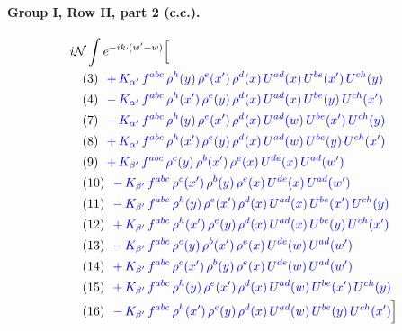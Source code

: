 \documentclass[10pt]{article}
\numberwithin{equation}{section}
\newcommand{\NN}{\mathcal N}
\begin{document}
\paragraph{Group I, Row II, part 2 (c.c.).}
\begin{align*}
&i\NN\int e^{-ik\cdot(w'-w)}\Big[\\
&\quad\text{(3)}\ \ \textcolor{blue}{+\,K_{\alpha'}\,f^{abc}\,\rho^{h}(y)\,\rho^{e}(x')\,\rho^{d}(x)\,U^{ad}(x)\,U^{be}(x')\,U^{ch}(y)}\\
&\quad\text{(4)}\ \ \textcolor{blue}{-\,K_{\alpha'}\,f^{abc}\,\rho^{h}(x')\,\rho^{e}(y)\,\rho^{d}(x)\,U^{ad}(x)\,U^{be}(y)\,U^{ch}(x')}\\
&\quad\text{(7)}\ \ \textcolor{blue}{-\,K_{\alpha'}\,f^{abc}\,\rho^{h}(y)\,\rho^{e}(x')\,\rho^{d}(x)\,U^{ad}(w)\,U^{be}(x')\,U^{ch}(y)}\\
&\quad\text{(8)}\ \ \textcolor{blue}{+\,K_{\alpha'}\,f^{abc}\,\rho^{h}(x')\,\rho^{e}(y)\,\rho^{d}(x)\,U^{ad}(w)\,U^{be}(y)\,U^{ch}(x')}\\
&\quad\text{(9)}\ \ \textcolor{blue}{+\,K_{\beta'}\,f^{abc}\,\rho^{c}(y)\,\rho^{b}(x')\,\rho^{e}(x)\,U^{de}(x)\,U^{ad}(w')}\\
&\quad\text{(10)}\ \ \textcolor{blue}{-\,K_{\beta'}\,f^{abc}\,\rho^{c}(x')\,\rho^{b}(y)\,\rho^{e}(x)\,U^{de}(x)\,U^{ad}(w')}\\
&\quad\text{(11)}\ \ \textcolor{blue}{-\,K_{\beta'}\,f^{abc}\,\rho^{h}(y)\,\rho^{e}(x')\,\rho^{d}(x)\,U^{ad}(x)\,U^{be}(x')\,U^{ch}(y)}\\
&\quad\text{(12)}\ \ \textcolor{blue}{+\,K_{\beta'}\,f^{abc}\,\rho^{h}(x')\,\rho^{e}(y)\,\rho^{d}(x)\,U^{ad}(x)\,U^{be}(y)\,U^{ch}(x')}\\
&\quad\text{(13)}\ \ \textcolor{blue}{-\,K_{\beta'}\,f^{abc}\,\rho^{c}(y)\,\rho^{b}(x')\,\rho^{e}(x)\,U^{de}(w)\,U^{ad}(w')}\\
&\quad\text{(14)}\ \ \textcolor{blue}{+\,K_{\beta'}\,f^{abc}\,\rho^{c}(x')\,\rho^{b}(y)\,\rho^{e}(x)\,U^{de}(w)\,U^{ad}(w')}\\
&\quad\text{(15)}\ \ \textcolor{blue}{+\,K_{\beta'}\,f^{abc}\,\rho^{h}(y)\,\rho^{e}(x')\,\rho^{d}(x)\,U^{ad}(w)\,U^{be}(x')\,U^{ch}(y)}\\
&\quad\text{(16)}\ \ \textcolor{blue}{-\,K_{\beta'}\,f^{abc}\,\rho^{h}(x')\,\rho^{e}(y)\,\rho^{d}(x)\,U^{ad}(w)\,U^{be}(y)\,U^{ch}(x')}\Big]
\end{align*}
\end{document}
